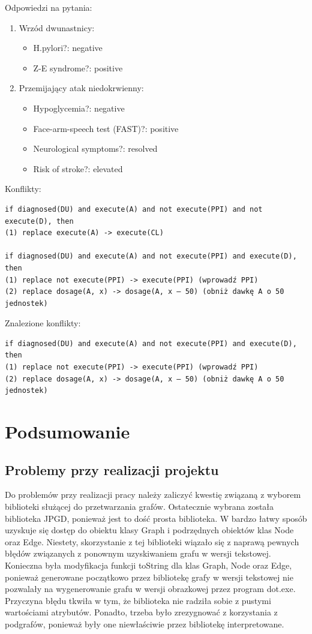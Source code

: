 \documentclass[oneside,a4paper]{book}
\begin{document}
\begin{spacing}{1.5}
\begin{figure}[H]
\end{figure}
\newpage
\noindent Odpowiedzi na pytania:
\begin{enumerate}
\item{Wrzód dwunastnicy:
	\begin{itemize}
	\item{H.pylori?: negative}
	\item{Z-E syndrome?: positive}
	\end{itemize}
}
\item{Przemijający atak niedokrwienny:
	\begin{itemize}
	\item{Hypoglycemia?: negative}
	\item{Face-arm-speech test (FAST)?: positive}
	\item{Neurological symptoms?: resolved}
	\item{Risk of stroke?: elevated}
	\end{itemize}
}
\end{enumerate}
Konflikty:
\begin{verbatim}
if diagnosed(DU) and execute(A) and not execute(PPI) and not execute(D), then 
(1) replace execute(A) -> execute(CL)

if diagnosed(DU) and execute(A) and not execute(PPI) and execute(D), then
(1) replace not execute(PPI) -> execute(PPI) (wprowadź PPI)
(2) replace dosage(A, x) -> dosage(A, x – 50) (obniż dawkę A o 50 jednostek)
\end{verbatim}
Znalezione konflikty:
\begin{verbatim}
if diagnosed(DU) and execute(A) and not execute(PPI) and execute(D), then
(1) replace not execute(PPI) -> execute(PPI) (wprowadź PPI)
(2) replace dosage(A, x) -> dosage(A, x – 50) (obniż dawkę A o 50 jednostek)
\end{verbatim}

\chapter{Podsumowanie}

\section{Problemy przy realizacji projektu}

Do problemów przy realizacji pracy należy zaliczyć kwestię związaną z wyborem biblioteki służącej do przetwarzania grafów. Ostatecznie wybrana została biblioteka JPGD, ponieważ jest to dość prosta biblioteka. W bardzo łatwy sposób uzyskuje się dostęp do obiektu klasy Graph i podrzędnych obiektów klas Node oraz Edge. Niestety, skorzystanie z tej biblioteki wiązało się z naprawą pewnych błędów związanych z ponownym uzyskiwaniem grafu w wersji tekstowej. Konieczna była modyfikacja funkcji toString dla klas Graph, Node oraz Edge, ponieważ generowane początkowo przez bibliotekę grafy w wersji tekstowej nie pozwalały na wygenerowanie grafu w wersji obrazkowej przez program dot.exe. Przyczyna błędu tkwiła w tym, że biblioteka nie radziła sobie z pustymi wartościami atrybutów. Ponadto, trzeba było zrezygnować z korzystania z podgrafów, ponieważ były one niewłaściwie przez bibliotekę interpretowane.


\end{spacing}
\end{document}
